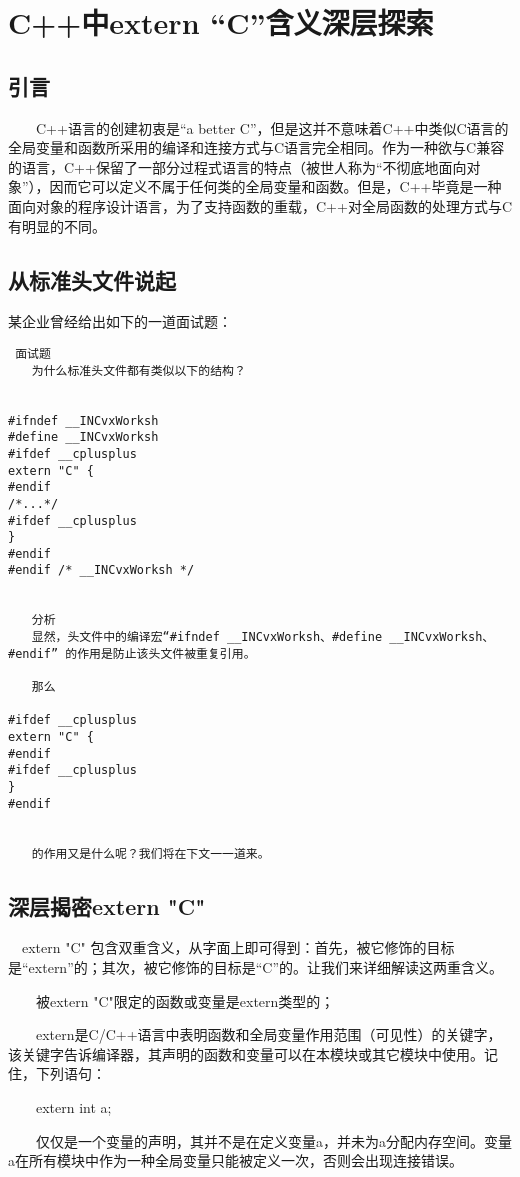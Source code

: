 \section{C++中extern “C”含义深层探索}
\subsection{引言}
　　C++语言的创建初衷是“a better C”，但是这并不意味着C++中类似C语言的全局变量和函数所采用的编译和连接方式与C语言完全相同。作为一种欲与C兼容的语言，C++保留了一部分过程式语言的特点（被世人称为“不彻底地面向对象”），因而它可以定义不属于任何类的全局变量和函数。但是，C++毕竟是一种面向对象的程序设计语言，为了支持函数的重载，C++对全局函数的处理方式与C有明显的不同。

\subsection{从标准头文件说起}
某企业曾经给出如下的一道面试题：
\begin{verbatim}
 面试题
　　为什么标准头文件都有类似以下的结构？


#ifndef __INCvxWorksh
#define __INCvxWorksh 
#ifdef __cplusplus
extern "C" {
#endif 
/*...*/ 
#ifdef __cplusplus
}
#endif 
#endif /* __INCvxWorksh */


　　分析
　　显然，头文件中的编译宏“#ifndef __INCvxWorksh、#define __INCvxWorksh、#endif” 的作用是防止该头文件被重复引用。

　　那么

#ifdef __cplusplus
extern "C" {
#endif 
#ifdef __cplusplus
}
#endif


　　的作用又是什么呢？我们将在下文一一道来。
\end{verbatim} 
\subsection{深层揭密extern "C"}
　extern "C" 包含双重含义，从字面上即可得到：首先，被它修饰的目标是“extern”的；其次，被它修饰的目标是“C”的。让我们来详细解读这两重含义。

　　被extern "C"限定的函数或变量是extern类型的；

　　extern是C/C++语言中表明函数和全局变量作用范围（可见性）的关键字，该关键字告诉编译器，其声明的函数和变量可以在本模块或其它模块中使用。记住，下列语句：

　　extern int a;

　　仅仅是一个变量的声明，其并不是在定义变量a，并未为a分配内存空间。变量a在所有模块中作为一种全局变量只能被定义一次，否则会出现连接错误。

